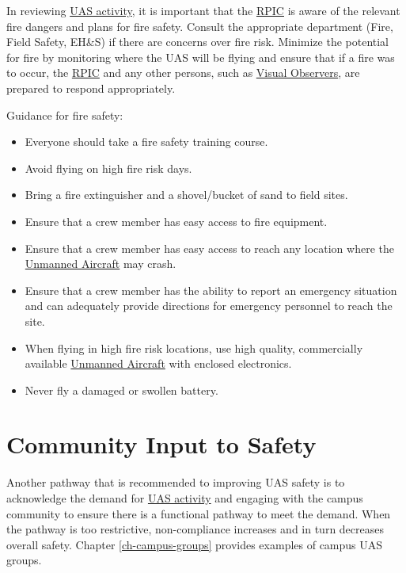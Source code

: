 \documentclass[
]{book}
\providecommand{\tightlist}{%
  \setlength{\itemsep}{0pt}\setlength{\parskip}{0pt}}
\begin{document}
In reviewing \protect\hyperlink{UASactivity}{UAS activity}, it is important that the \protect\hyperlink{RPIC}{RPIC} is aware of the relevant fire dangers and plans for fire safety. Consult the appropriate department (Fire, Field Safety, EH\&S) if there are concerns over fire risk. Minimize the potential for fire by monitoring where the UAS will be flying and ensure that if a fire was to occur, the \protect\hyperlink{RPIC}{RPIC} and any other persons, such as \protect\hyperlink{VO}{Visual Observers}, are prepared to respond appropriately.

Guidance for fire safety:

\begin{itemize}
\tightlist
\item
  Everyone should take a fire safety training course.
\item
  Avoid flying on high fire risk days.
\item
  Bring a fire extinguisher and a shovel/bucket of sand to field sites.
\item
  Ensure that a crew member has easy access to fire equipment.
\item
  Ensure that a crew member has easy access to reach any location where the \protect\hyperlink{UA}{Unmanned Aircraft} may crash.
\item
  Ensure that a crew member has the ability to report an emergency situation and can adequately provide directions for emergency personnel to reach the site.
\item
  When flying in high fire risk locations, use high quality, commercially available \protect\hyperlink{UA}{Unmanned Aircraft} with enclosed electronics.
\item
  Never fly a damaged or swollen battery.
\end{itemize}

\hypertarget{s-community-input}{%
\section{Community Input to Safety}\label{s-community-input}}

Another pathway that is recommended to improving UAS safety is to acknowledge the demand for \protect\hyperlink{UASactivity}{UAS activity} and engaging with the campus community to ensure there is a functional pathway to meet the demand. When the pathway is too restrictive, non-compliance increases and in turn decreases overall safety. Chapter \ref{ch-campus-groups} provides examples of campus UAS groups.
\end{document}
